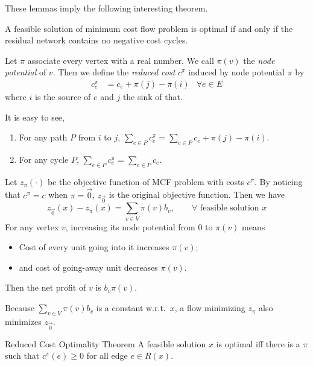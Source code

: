 \documentclass[UTF8,a4paper]{ctexart}
\begin{document}
These lemmas imply the following interesting theorem.

\begin{theorem}
    A feasible solution of minimum cost flow problem is optimal if and only if the residual network contains no negative cost cycles.
\end{theorem}

\begin{definition}
    Let $\pi$ associate every vertex with a real number.
    We call $\pi(v)$ the \emph{node potential} of $v$.
    Then we define the \emph{reduced cost} $c^\pi$ induced by node potential $\pi$ by
    \begin{align}
        c^\pi_e&=c_e + \pi(j) - \pi(i) &\forall e\in E
    \end{align}
    where $i$ is the source of $e$ and $j$ the sink of that.

    It is easy to see,
    \begin{enumerate}
        \item For any path $P$ from $i$ to $j$, $\sum_{e\in P}c^\pi_e = \sum_{e\in P}c_e + \pi(j) - \pi(i)$.
        \item For any cycle $P$, $\sum_{e\in P}c^\pi_e = \sum_{e\in P} c_e$.
    \end{enumerate}

    Let $z_\pi(\cdot)$ be the objective function of MCF problem with costs $c^\pi$.
    By noticing that $c^\pi=c$ when $\pi=\vec{0}$, $z_{\vec{0}}$ is the original objective function.
    Then we have
    \[
        z_{\vec{0}}(x)-z_\pi(x)=\sum_{v\in V}\pi(v)b_v, \qquad \forall\text{ feasible solution } x
    \]
    For any vertex $v$, increasing its node potential from $0$ to $\pi(v)$ means
    \begin{itemize}
        \item Cost of every unit going into it increases $\pi(v)$;
        \item and cost of going-away unit decreases $\pi(v)$.
    \end{itemize}
    Then the net profit of $v$ is $b_v\pi(v)$.

    Because $\sum_{v\in V}\pi(v)b_v$ is a constant w.r.t.\ $x$, a flow minimizing $z_\pi$ also minimizes $z_{\vec{0}}$.
\end{definition}

\begin{theorem}{Reduced Cost Optimality Theorem}
    A feasible solution $x$ is optimal iff there is a $\pi$ such that $c^\pi(e)\geq 0$ for all edge $e\in R(x)$.
\end{theorem}
\end{document}
